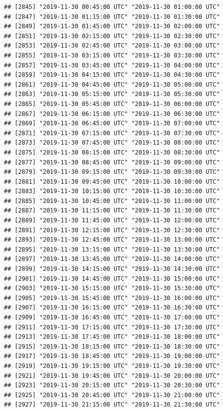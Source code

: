 \documentclass{article}\usepackage[]{graphicx}\usepackage[]{color}
\makeatletter
\newenvironment{kframe}{%
 \def\at@end@of@kframe{}%
 \ifinner\ifhmode%
  \def\at@end@of@kframe{\end{minipage}}%
  \begin{minipage}{\columnwidth}%
 \fi\fi%
 \def\FrameCommand##1{\hskip\@totalleftmargin \hskip-\fboxsep
 \colorbox{shadecolor}{##1}\hskip-\fboxsep
     \hskip-\linewidth \hskip-\@totalleftmargin \hskip\columnwidth}%
 \MakeFramed {\advance\hsize-\width
   \@totalleftmargin\z@ \linewidth\hsize
   \@setminipage}}%
 {\par\unskip\endMakeFramed%
 \at@end@of@kframe}
\newenvironment{knitrout}{}{} %
\makeatother
\begin{document}
\begin{knitrout}
\begin{kframe}
\begin{verbatim}
## [2845] "2019-11-30 00:45:00 UTC" "2019-11-30 01:00:00 UTC"
## [2847] "2019-11-30 01:15:00 UTC" "2019-11-30 01:30:00 UTC"
## [2849] "2019-11-30 01:45:00 UTC" "2019-11-30 02:00:00 UTC"
## [2851] "2019-11-30 02:15:00 UTC" "2019-11-30 02:30:00 UTC"
## [2853] "2019-11-30 02:45:00 UTC" "2019-11-30 03:00:00 UTC"
## [2855] "2019-11-30 03:15:00 UTC" "2019-11-30 03:30:00 UTC"
## [2857] "2019-11-30 03:45:00 UTC" "2019-11-30 04:00:00 UTC"
## [2859] "2019-11-30 04:15:00 UTC" "2019-11-30 04:30:00 UTC"
## [2861] "2019-11-30 04:45:00 UTC" "2019-11-30 05:00:00 UTC"
## [2863] "2019-11-30 05:15:00 UTC" "2019-11-30 05:30:00 UTC"
## [2865] "2019-11-30 05:45:00 UTC" "2019-11-30 06:00:00 UTC"
## [2867] "2019-11-30 06:15:00 UTC" "2019-11-30 06:30:00 UTC"
## [2869] "2019-11-30 06:45:00 UTC" "2019-11-30 07:00:00 UTC"
## [2871] "2019-11-30 07:15:00 UTC" "2019-11-30 07:30:00 UTC"
## [2873] "2019-11-30 07:45:00 UTC" "2019-11-30 08:00:00 UTC"
## [2875] "2019-11-30 08:15:00 UTC" "2019-11-30 08:30:00 UTC"
## [2877] "2019-11-30 08:45:00 UTC" "2019-11-30 09:00:00 UTC"
## [2879] "2019-11-30 09:15:00 UTC" "2019-11-30 09:30:00 UTC"
## [2881] "2019-11-30 09:45:00 UTC" "2019-11-30 10:00:00 UTC"
## [2883] "2019-11-30 10:15:00 UTC" "2019-11-30 10:30:00 UTC"
## [2885] "2019-11-30 10:45:00 UTC" "2019-11-30 11:00:00 UTC"
## [2887] "2019-11-30 11:15:00 UTC" "2019-11-30 11:30:00 UTC"
## [2889] "2019-11-30 11:45:00 UTC" "2019-11-30 12:00:00 UTC"
## [2891] "2019-11-30 12:15:00 UTC" "2019-11-30 12:30:00 UTC"
## [2893] "2019-11-30 12:45:00 UTC" "2019-11-30 13:00:00 UTC"
## [2895] "2019-11-30 13:15:00 UTC" "2019-11-30 13:30:00 UTC"
## [2897] "2019-11-30 13:45:00 UTC" "2019-11-30 14:00:00 UTC"
## [2899] "2019-11-30 14:15:00 UTC" "2019-11-30 14:30:00 UTC"
## [2901] "2019-11-30 14:45:00 UTC" "2019-11-30 15:00:00 UTC"
## [2903] "2019-11-30 15:15:00 UTC" "2019-11-30 15:30:00 UTC"
## [2905] "2019-11-30 15:45:00 UTC" "2019-11-30 16:00:00 UTC"
## [2907] "2019-11-30 16:15:00 UTC" "2019-11-30 16:30:00 UTC"
## [2909] "2019-11-30 16:45:00 UTC" "2019-11-30 17:00:00 UTC"
## [2911] "2019-11-30 17:15:00 UTC" "2019-11-30 17:30:00 UTC"
## [2913] "2019-11-30 17:45:00 UTC" "2019-11-30 18:00:00 UTC"
## [2915] "2019-11-30 18:15:00 UTC" "2019-11-30 18:30:00 UTC"
## [2917] "2019-11-30 18:45:00 UTC" "2019-11-30 19:00:00 UTC"
## [2919] "2019-11-30 19:15:00 UTC" "2019-11-30 19:30:00 UTC"
## [2921] "2019-11-30 19:45:00 UTC" "2019-11-30 20:00:00 UTC"
## [2923] "2019-11-30 20:15:00 UTC" "2019-11-30 20:30:00 UTC"
## [2925] "2019-11-30 20:45:00 UTC" "2019-11-30 21:00:00 UTC"
## [2927] "2019-11-30 21:15:00 UTC" "2019-11-30 21:30:00 UTC"

\end{verbatim}
\end{kframe}
\end{knitrout}
\end{document}

